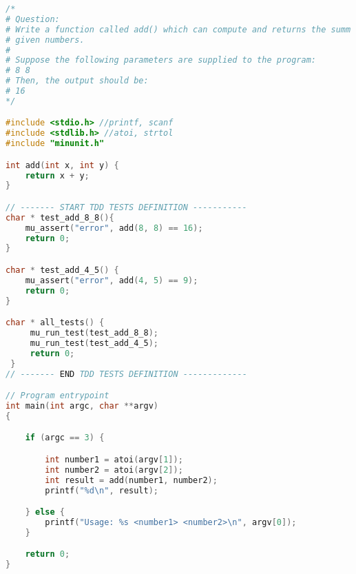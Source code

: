 \begin{lstlisting}[language=c,caption={exercise\_2.c},captionpos=b]
/*
# Question:
# Write a function called add() which can compute and returns the summ of two
# given numbers.
#
# Suppose the following parameters are supplied to the program:
# 8 8
# Then, the output should be:
# 16
*/

#include <stdio.h> //printf, scanf
#include <stdlib.h> //atoi, strtol
#include "minunit.h"

int add(int x, int y) {
    return x + y;
}

// ------- START TDD TESTS DEFINITION -----------
char * test_add_8_8(){
    mu_assert("error", add(8, 8) == 16);
    return 0;
}

char * test_add_4_5() {
    mu_assert("error", add(4, 5) == 9);
    return 0;
}

char * all_tests() {
     mu_run_test(test_add_8_8);
     mu_run_test(test_add_4_5);
     return 0;
 }
// ------- END TDD TESTS DEFINITION -------------

// Program entrypoint
int main(int argc, char **argv)
{

    if (argc == 3) {

        int number1 = atoi(argv[1]);
        int number2 = atoi(argv[2]);
        int result = add(number1, number2);
        printf("%d\n", result);

    } else {
        printf("Usage: %s <number1> <number2>\n", argv[0]);
    }

    return 0;
}
\end{lstlisting}

